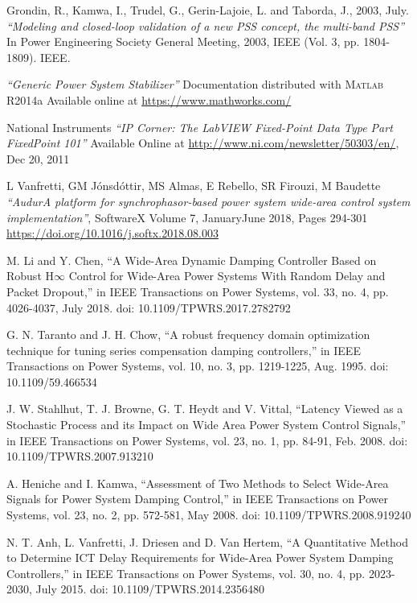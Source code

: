 \documentclass{ieeeaccess}
\begin{document}
\begin{thebibliography}{00}
 Grondin, R., Kamwa, I., Trudel, G., Gerin-Lajoie, L. and Taborda, J., 2003, July. \emph{``Modeling and closed-loop validation of a new PSS concept, the multi-band PSS''} In Power Engineering Society General Meeting, 2003, IEEE (Vol. 3, pp. 1804-1809). IEEE.

 \emph{``Generic Power System Stabilizer''} Documentation distributed with \textsc{Matlab} R2014a Available online at \underline{https://www.mathworks.com/}

National Instruments \emph{``IP Corner: The LabVIEW Fixed-Point Data Type Part Fixed\textendash Point 101''} Available Online at \underline{http://www.ni.com/newsletter/50303/en/}, Dec 20, 2011 

 L Vanfretti, GM J\'{o}nsd\'{o}ttir, MS Almas, E Rebello, SR Firouzi, M Baudette \emph{``Audur\textendash A platform for synchrophasor-based power system wide-area control system implementation''}, SoftwareX Volume 7, January\textendash June 2018, Pages 294-301 \underline{https://doi.org/10.1016/j.softx.2018.08.003}

 M. Li and Y. Chen, ``A Wide-Area Dynamic Damping Controller Based on Robust H$\infty$ Control for Wide-Area Power Systems With Random Delay and Packet Dropout,'' in IEEE Transactions on Power Systems, vol. 33, no. 4, pp. 4026-4037, July 2018. doi: 10.1109/TPWRS.2017.2782792

 G. N. Taranto and J. H. Chow, ``A robust frequency domain optimization technique for tuning series compensation damping controllers,'' in IEEE Transactions on Power Systems, vol. 10, no. 3, pp. 1219-1225, Aug. 1995.
doi: 10.1109/59.466534

 J. W. Stahlhut, T. J. Browne, G. T. Heydt and V. Vittal, ``Latency Viewed as a Stochastic Process and its Impact on Wide Area Power System Control Signals,''  in IEEE Transactions on Power Systems, vol. 23, no. 1, pp. 84-91, Feb. 2008. doi: 10.1109/TPWRS.2007.913210

 A. Heniche and I. Kamwa, ``Assessment of Two Methods to Select Wide-Area Signals for Power System Damping Control,'' in IEEE Transactions on Power Systems, vol. 23, no. 2, pp. 572-581, May 2008. doi: 10.1109/TPWRS.2008.919240

 N. T. Anh, L. Vanfretti, J. Driesen and D. Van Hertem, ``A Quantitative Method to Determine ICT Delay Requirements for Wide-Area Power System Damping Controllers,'' in IEEE Transactions on Power Systems, vol. 30, no. 4, pp. 2023-2030, July 2015.
doi: 10.1109/TPWRS.2014.2356480


\end{thebibliography}
\end{document}
